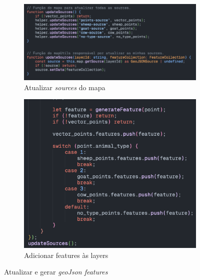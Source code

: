 \begin{figure}[!h]
	\centering
	\begin{subfigure}[c]{0.45\textwidth}
		\centering
		\includegraphics[width=\textwidth]{figs/updateSources.png}
		\caption{Atualizar \textit{sources} do mapa}
		\label{fig:updateSources}
	\end{subfigure}
	\hfill
	\begin{subfigure}[c]{0.35\textwidth}
		\centering
		\includegraphics[width=\textwidth]{figs/pushFeatures.png}
		\caption{Adicionar features às layers}
		\label{fig:pushFeatures}
	\end{subfigure}
	\caption{Atualizar e gerar \textit{geoJson features}}
    \label{fig:updateFeatures}
\end{figure}

